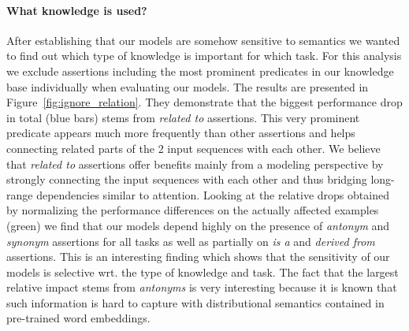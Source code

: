 \documentclass[11pt,a4paper]{article}
\begin{document}
\paragraph{What knowledge is used?} After establishing that our models are somehow sensitive to semantics we wanted to find out which type of knowledge is important for which task. For this analysis we exclude assertions including the most prominent predicates in our knowledge base individually when evaluating our models. The results are presented in Figure~\ref{fig:ignore_relation}. They demonstrate that the biggest performance drop in total (blue bars) stems from \textit{related to} assertions. This very prominent predicate appears much more frequently than other assertions and helps connecting related parts of the 2 input sequences with each other. We believe that \textit{related to} assertions offer benefits mainly from a modeling perspective by strongly connecting the input sequences with each other and thus bridging long-range dependencies similar to attention. Looking at the relative drops obtained by normalizing the performance differences on the actually affected examples (green) we find that our models depend highly on the presence of \textit{antonym} and \textit{synonym} assertions for all tasks as well as partially on \textit{is a} and \textit{derived from} assertions. This is an interesting finding which shows that the sensitivity of our models is selective wrt. the type of knowledge and task. The fact that the largest relative impact stems from \textit{antonyms} is very interesting because it is known that such information is hard to capture with distributional semantics contained in pre-trained word embeddings.


\end{document}
